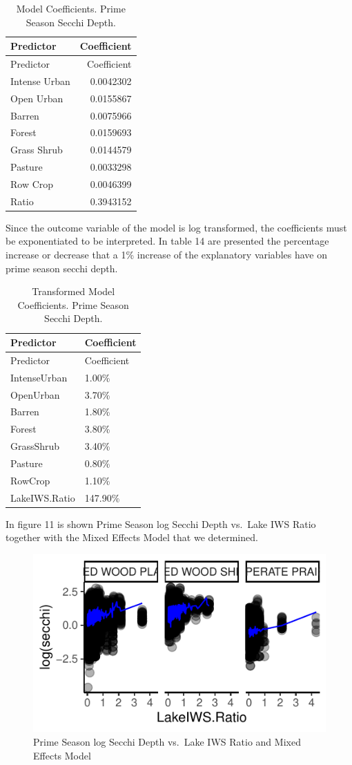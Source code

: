 \documentclass[12pt,]{article}
\begin{document}
\begin{longtable}[]{@{}lr@{}}
\caption{Model Coefficients. Prime Season Secchi Depth.}\tabularnewline
\toprule
Predictor & Coefficient\tabularnewline
\midrule
\endfirsthead
\toprule
Predictor & Coefficient\tabularnewline
\midrule
\endhead
Intense Urban & 0.0042302\tabularnewline
Open Urban & 0.0155867\tabularnewline
Barren & 0.0075966\tabularnewline
Forest & 0.0159693\tabularnewline
Grass Shrub & 0.0144579\tabularnewline
Pasture & 0.0033298\tabularnewline
Row Crop & 0.0046399\tabularnewline
Ratio & 0.3943152\tabularnewline
\bottomrule
\end{longtable}

Since the outcome variable of the model is log transformed, the
coefficients must be exponentiated to be interpreted. In table 14 are
presented the percentage increase or decrease that a 1\% increase of the
explanatory variables have on prime season secchi depth.

\begin{longtable}[]{@{}ll@{}}
\caption{Transformed Model Coefficients. Prime Season Secchi
Depth.}\tabularnewline
\toprule
Predictor & Coefficient\tabularnewline
\midrule
\endfirsthead
\toprule
Predictor & Coefficient\tabularnewline
\midrule
\endhead
IntenseUrban & 1.00\%\tabularnewline
OpenUrban & 3.70\%\tabularnewline
Barren & 1.80\%\tabularnewline
Forest & 3.80\%\tabularnewline
GrassShrub & 3.40\%\tabularnewline
Pasture & 0.80\%\tabularnewline
RowCrop & 1.10\%\tabularnewline
LakeIWS.Ratio & 147.90\%\tabularnewline
\bottomrule
\end{longtable}

In figure 11 is shown Prime Season log Secchi Depth vs.~Lake IWS Ratio
together with the Mixed Effects Model that we determined.

\begin{figure}
\centering
\includegraphics{Bollt_Greif_Raby_Roth_Project_Final_files/figure-latex/unnamed-chunk-28-1.pdf}
\caption{Prime Season log Secchi Depth vs.~Lake IWS Ratio and Mixed
Effects Model}
\end{figure}
\end{document}
